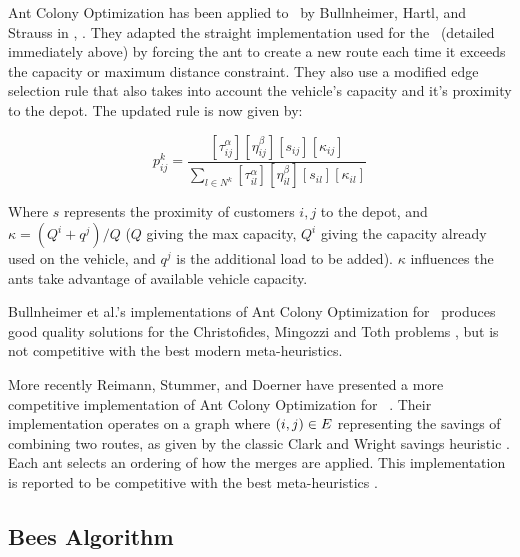  
Ant Colony Optimization has been applied to \VRP\ by Bullnheimer, Hartl, and Strauss in \cite{BHS:1999A}, \cite{BHS:1999B}. They adapted the straight implementation used for the \TSP\ (detailed immediately above) by forcing the ant to create a new route each time it exceeds the capacity or maximum distance constraint. They also use a modified edge selection rule that also takes into account the vehicle's capacity and it's proximity to the depot. The updated rule is now given by:

\[
   p_{ij}^k = \frac{ [\tau_{ij}^{\alpha}] [\eta_{ij}^{\beta}] [s_{ij}] [\kappa_{ij}]  }{ \sum_{l \in N^k} [\tau_{il}^{\alpha}] [\eta_{il}^{\beta}] [s_{il}] [\kappa_{il}] }
\]

Where $s$ represents the proximity of customers $i, j$ to the depot, and $\kappa = (Q^i + q^j) / Q$ ($Q$ giving the max capacity, $Q^i$ giving the capacity already used on the vehicle, and $q^j$ is the additional load to be added). $\kappa$ influences the ants take advantage of available vehicle capacity. 

Bullnheimer et al.'s implementations of Ant Colony Optimization for \VRP\ produces good quality solutions for the Christofides, Mingozzi and Toth problems \cite{CMT:1981}, but is not competitive with the best modern meta-heuristics.

More recently Reimann, Stummer, and Doerner have presented a more competitive implementation of Ant Colony Optimization for \VRP\ \cite{RSD:2002}. Their implementation operates on a graph where $(i,j) \in E$ representing the savings of combining two routes, as given by the classic Clark and Wright savings heuristic \cite{clark:1964}. Each ant selects an ordering of how the merges are applied. This implementation is reported to be competitive with the best meta-heuristics \cite{Potvin:2009}.   
 
% 
% 

\subsection{Bees Algorithm}

